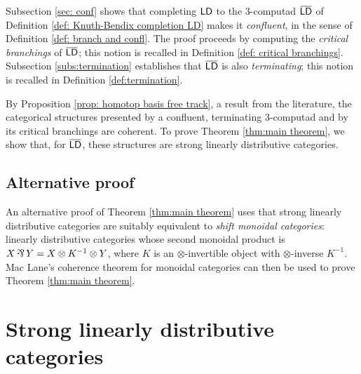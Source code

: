 \documentclass[reqno,12pt]{amsart}
\begin{document}
Subsection \ref{sec: conf} shows that completing $\mathsf{LD}$ to the $3$-computad $\highoverline{\ms{LD}}$ of Definition \ref{def: Knuth-Bendix completion LD} makes it \emph{confluent}, in the sense of Definition \ref{def: branch and confl}. The proof proceeds by computing the \emph{critical branchings} of $\highoverline{\ms{LD}}$; this notion is recalled in Definition \ref{def: critical branchings}. Subsection \ref{subs:termination} establishes that $\highoverline{\ms{LD}}$ is also \emph{terminating}; this notion is recalled in Definition \ref{def:termination}. 

By Proposition \ref{prop: homotop basis free track}, a result from the literature, the categorical structures presented by a confluent, terminating $3$-computad and by its critical branchings are coherent. To prove Theorem \ref{thm:main theorem}, we show that, for $\highoverline{\ms{LD}}$, these structures are strong linearly distributive categories.

\subsection{Alternative proof}
An alternative proof of Theorem \ref{thm:main theorem} uses that strong linearly distributive categories are suitably equivalent \cite{CS97,De22} to \emph{shift monoidal categories}: linearly distributive categories whose second monoidal product is ${X} \partimes {Y} ={X} \otimes {{K^{-1}} \otimes {Y}}$, where $K$ is an $\otimes$-invertible object with ${\otimes}$-inverse $K^{-1}$. Mac Lane's coherence theorem for monoidal categories can then be used to prove Theorem \ref{thm:main theorem}.

\section{Strong linearly distributive categories}
\end{document}
